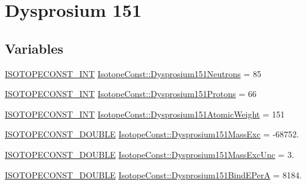 \hypertarget{group___isotope_const-_dysprosium-_dy151}{}\section{Dysprosium 151}
\label{group___isotope_const-_dysprosium-_dy151}
\subsection*{Variables}
\begin{DoxyCompactItemize}
\item 
\mbox{\hyperlink{group___isotope_const-_macros_ga5f18360b3e99483a35c32d789e62621c}{I\+S\+O\+T\+O\+P\+E\+C\+O\+N\+S\+T\+\_\+\+I\+NT}} \mbox{\hyperlink{group___isotope_const-_dysprosium-_dy151_ga1619e9c77cab8ad502709ca913169d34}{Isotope\+Const\+::\+Dysprosium151\+Neutrons}} = 85
\item 
\mbox{\hyperlink{group___isotope_const-_macros_ga5f18360b3e99483a35c32d789e62621c}{I\+S\+O\+T\+O\+P\+E\+C\+O\+N\+S\+T\+\_\+\+I\+NT}} \mbox{\hyperlink{group___isotope_const-_dysprosium-_dy151_gafc7e9eac973f8d6f0d0cbf22abc0b335}{Isotope\+Const\+::\+Dysprosium151\+Protons}} = 66
\item 
\mbox{\hyperlink{group___isotope_const-_macros_ga5f18360b3e99483a35c32d789e62621c}{I\+S\+O\+T\+O\+P\+E\+C\+O\+N\+S\+T\+\_\+\+I\+NT}} \mbox{\hyperlink{group___isotope_const-_dysprosium-_dy151_ga7eb979b188779bd920bdc8b1ee58d8c6}{Isotope\+Const\+::\+Dysprosium151\+Atomic\+Weight}} = 151
\item 
\mbox{\hyperlink{group___isotope_const-_macros_ga8f45a7272ce02c0b4c65c44636ed719a}{I\+S\+O\+T\+O\+P\+E\+C\+O\+N\+S\+T\+\_\+\+D\+O\+U\+B\+LE}} \mbox{\hyperlink{group___isotope_const-_dysprosium-_dy151_gaf1e6bf4a09f4290bf453a00866c53dd5}{Isotope\+Const\+::\+Dysprosium151\+Mass\+Exc}} = -\/68752.
\item 
\mbox{\hyperlink{group___isotope_const-_macros_ga8f45a7272ce02c0b4c65c44636ed719a}{I\+S\+O\+T\+O\+P\+E\+C\+O\+N\+S\+T\+\_\+\+D\+O\+U\+B\+LE}} \mbox{\hyperlink{group___isotope_const-_dysprosium-_dy151_gaf4648653411166102cd8d9edd9232f60}{Isotope\+Const\+::\+Dysprosium151\+Mass\+Exc\+Unc}} = 3.
\item 
\mbox{\hyperlink{group___isotope_const-_macros_ga8f45a7272ce02c0b4c65c44636ed719a}{I\+S\+O\+T\+O\+P\+E\+C\+O\+N\+S\+T\+\_\+\+D\+O\+U\+B\+LE}} \mbox{\hyperlink{group___isotope_const-_dysprosium-_dy151_gaebf35b00c4e9bb5856ac24633f449aee}{Isotope\+Const\+::\+Dysprosium151\+Bind\+E\+PerA}} = 8184.

\end{DoxyCompactItemize}
